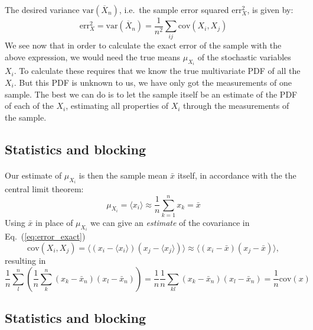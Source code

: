 \documentclass[%
twoside,                 %
final,                   %
10pt]{article}
\begin{document}
\paragraph{}
The desired variance
$\mathrm{var}(\overline X_n)$, i.e.~the sample error squared
$\mathrm{err}_X^2$, is given by:
\begin{equation}
\mathrm{err}_X^2 = \mathrm{var}(\overline X_n) = \frac{1}{n^2}
\sum_{ij} \mathrm{cov}(X_i, X_j)
\label{eq:error_exact}
\end{equation}
We see now that in order to calculate the exact error of the sample
with the above expression, we would need the true means
$\mu_{X_i}^{\phantom X}$ of the stochastic variables $X_i$. To
calculate these requires that we know the true multivariate PDF of all
the $X_i$. But this PDF is unknown to us, we have only got the measurements of
one sample. The best we can do is to let the sample itself be an
estimate of the PDF of each of the $X_i$, estimating all properties of
$X_i$ through the measurements of the sample.




\subsection*{Statistics and blocking}

\paragraph{}
Our estimate of $\mu_{X_i}^{\phantom X}$ is then the sample mean $\bar x$
itself, in accordance with the the central limit theorem:
\[
\mu_{X_i}^{\phantom X} = \langle x_i\rangle \approx \frac{1}{n}\sum_{k=1}^n x_k = \bar x
\]
Using $\bar x$ in place of $\mu_{X_i}^{\phantom X}$ we can give an
\emph{estimate} of the covariance in Eq.~(\ref{eq:error_exact})
\[
\mathrm{cov}(X_i, X_j) = \langle (x_i-\langle x_i\rangle)(x_j-\langle x_j\rangle)\rangle
\approx\langle (x_i - \bar x)(x_j - \bar{x})\rangle,
\]
resulting in
\[ 
\frac{1}{n} \sum_{l}^n \left(\frac{1}{n}\sum_{k}^n (x_k -\bar x_n)(x_l - \bar x_n)\right)=\frac{1}{n}\frac{1}{n} \sum_{kl} (x_k -\bar x_n)(x_l - \bar x_n)=\frac{1}{n}\mathrm{cov}(x)
\]



\subsection*{Statistics and blocking}
\end{document}
